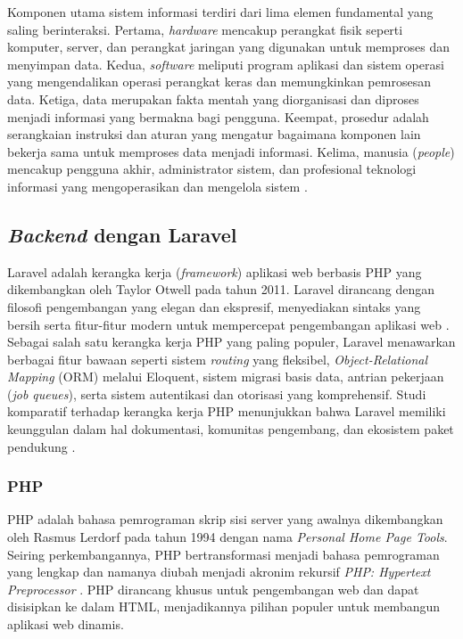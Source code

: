 Komponen utama sistem informasi terdiri dari lima elemen fundamental yang saling berinteraksi. Pertama, \textit{hardware} mencakup perangkat fisik seperti komputer, server, dan perangkat jaringan yang digunakan untuk memproses dan menyimpan data. Kedua, \textit{software} meliputi program aplikasi dan sistem operasi yang mengendalikan operasi perangkat keras dan memungkinkan pemrosesan data. Ketiga, data merupakan fakta mentah yang diorganisasi dan diproses menjadi informasi yang bermakna bagi pengguna. Keempat, prosedur adalah serangkaian instruksi dan aturan yang mengatur bagaimana komponen lain bekerja sama untuk memproses data menjadi informasi. Kelima, manusia (\textit{people}) mencakup pengguna akhir, administrator sistem, dan profesional teknologi informasi yang mengoperasikan dan mengelola sistem \citep{OBrien_2012_MIS}.

\subsection{\textit{Backend} dengan Laravel}

Laravel adalah kerangka kerja (\textit{framework}) aplikasi web berbasis PHP yang dikembangkan oleh Taylor Otwell pada tahun 2011. Laravel dirancang dengan filosofi pengembangan yang elegan dan ekspresif, menyediakan sintaks yang bersih serta fitur-fitur modern untuk mempercepat pengembangan aplikasi web \citep{Laravel_2026_Docs}. Sebagai salah satu kerangka kerja PHP yang paling populer, Laravel menawarkan berbagai fitur bawaan seperti sistem \textit{routing} yang fleksibel, \textit{Object-Relational Mapping} (ORM) melalui Eloquent, sistem migrasi basis data, antrian pekerjaan (\textit{job queues}), serta sistem autentikasi dan otorisasi yang komprehensif. Studi komparatif terhadap kerangka kerja PHP menunjukkan bahwa Laravel memiliki keunggulan dalam hal dokumentasi, komunitas pengembang, dan ekosistem paket pendukung \citep{Laaziri_2019_PHPFrameworks}.

\subsubsection{PHP}

PHP adalah bahasa pemrograman skrip sisi server yang awalnya dikembangkan oleh Rasmus Lerdorf pada tahun 1994 dengan nama \textit{Personal Home Page Tools}. Seiring perkembangannya, PHP bertransformasi menjadi bahasa pemrograman yang lengkap dan namanya diubah menjadi akronim rekursif \textit{PHP: Hypertext Preprocessor} \citep{PHP_2026_History}. PHP dirancang khusus untuk pengembangan web dan dapat disisipkan ke dalam HTML, menjadikannya pilihan populer untuk membangun aplikasi web dinamis.

